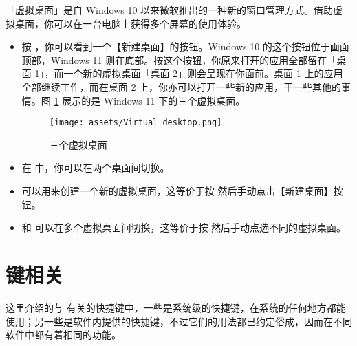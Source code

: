 \begin{itemize}
  「虚拟桌面」是自 Windows 10 以来微软推出的一种新的窗口管理方式。借助虚拟桌面，你可以在一台电脑上获得多个屏幕的使用体验。
  \begin{itemize}
    \item 按 ，你可以看到一个【新建桌面】的按钮。Windows 10 的这个按钮位于画面顶部，Windows 11 则在底部。按这个按钮，你原来打开的应用全部留在「桌面 1」，而一个新的虚拟桌面「桌面 2」则会呈现在你面前。桌面 1 上的应用全部继续工作，而在桌面 2 上，你亦可以打开一些新的应用，干一些其他的事情。图 \ref{Virtual_desktop} 展示的是 Windows 11 下的三个虚拟桌面。
    \begin{figure}[htb!]
      \centering
      \texttt{[image: assets/Virtual\_desktop.png]}
      \caption{三个虚拟桌面}
      \label{Virtual_desktop}
    \end{figure}
    \item 在  中，你可以在两个桌面间切换。    
    \item {} 可以用来创建一个新的虚拟桌面，这等价于按  然后手动点击【新建桌面】按钮。
    \item {} 和  可以在多个虚拟桌面间切换，这等价于按  然后手动点选不同的虚拟桌面。
  \end{itemize}
\end{itemize}

\section{ 键相关}

这里介绍的与  有关的快捷键中，一些是系统级的快捷键，在系统的任何地方都能使用；另一些是软件内提供的快捷键，不过它们的用法都已约定俗成，因而在不同软件中都有着相同的功能。

